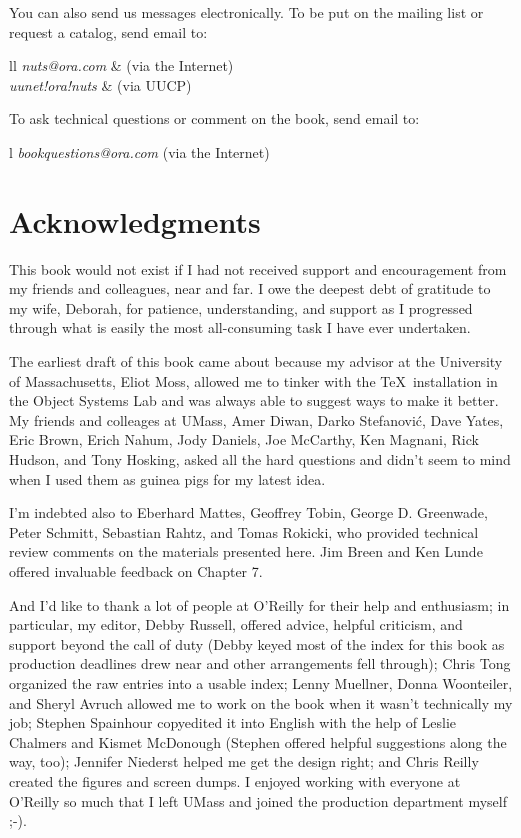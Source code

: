 You can also send us messages electronically.  To be put on the mailing list
or request a catalog, send email to:

\begin{xtable}{ll}
  {\it nuts@ora.com} & (via the Internet) \\ 
  {\it uunet!ora!nuts} & (via UUCP) \\
\end{xtable}

To ask technical questions or comment on the book, send email to:

\begin{xtable}{l}
  {\it bookquestions@ora.com} (via the Internet)
\end{xtable}

\section{Acknowledgments}

This book would not exist if I had not received support and encouragement from
my friends and colleagues, near and far.  I owe the deepest debt of gratitude
to my wife, Deborah, for patience, understanding, and support as I progressed
through what is easily the most all-consuming task I have ever undertaken.

The earliest draft of this book came about because my advisor at
the University of Massachusetts, Eliot Moss, allowed me to tinker with the
\TeX\ installation in the Object Systems Lab and was always able to suggest
ways to make it better.  My friends and colleages at UMass, Amer Diwan, Darko
Stefanovi\'c, Dave Yates, Eric Brown, Erich Nahum, Jody Daniels, Joe McCarthy,
Ken Magnani, Rick Hudson, and Tony Hosking, asked all the hard questions and
didn't seem to mind when I used them as guinea pigs for my latest idea.

I'm indebted also to 
Eberhard Mattes, 
Geoffrey Tobin,
George D. Greenwade, 
Peter Schmitt, 
Sebastian Rahtz, and
Tomas Rokicki, 
who provided
technical review comments on the materials presented here.  
Jim Breen and Ken Lunde
offered invaluable feedback on Chapter 7.

And I'd like to thank a lot of people at O'Reilly for their help and
enthusiasm; in particular, my editor, Debby Russell, offered advice, helpful
criticism, and support beyond the call of duty (Debby keyed most of the index
for this book as production deadlines drew near and other arrangements fell
through); Chris Tong organized the raw entries into a usable index; Lenny
Muellner, Donna Woonteiler, and Sheryl Avruch allowed me to work on the book
when it wasn't technically my job; Stephen Spainhour copyedited it into
English with the help of Leslie Chalmers and Kismet McDonough (Stephen offered
helpful suggestions along the way, too); Jennifer Niederst helped me get the
design right; and Chris Reilly created the figures and screen dumps.  I
enjoyed working with everyone at O'Reilly so much that I left UMass and joined
the production department myself ;-).

